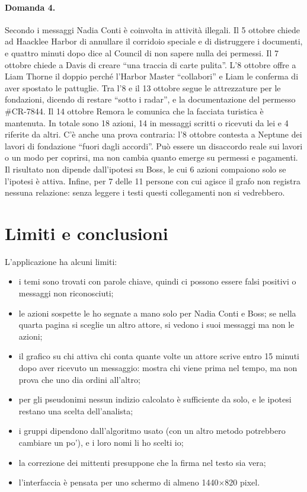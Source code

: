 \documentclass[11pt,a4paper]{article}
\begin{document}
\paragraph{Domanda 4.} Secondo i messaggi Nadia Conti è coinvolta in attività illegali. Il 5 ottobre chiede ad
Haacklee Harbor di annullare il corridoio speciale e di distruggere i documenti, e quattro minuti dopo dice al
Council di non sapere nulla dei permessi. Il 7 ottobre chiede a Davis di creare ``una traccia di carte pulita''.
L'8 ottobre offre a Liam Thorne il doppio perché l'Harbor Master ``collabori'' e Liam le conferma di aver
spostato le pattuglie. Tra l'8 e il 13 ottobre segue le attrezzature per le fondazioni, dicendo di restare
``sotto i radar'', e la documentazione del permesso \#CR-7844. Il 14 ottobre Remora le comunica che la facciata
turistica è mantenuta. In totale sono 18 azioni, 14 in messaggi scritti o ricevuti da lei e 4 riferite da altri.
C'è anche una prova contraria: l'8 ottobre contesta a Neptune dei lavori di fondazione ``fuori dagli accordi''.
Può essere un disaccordo reale sui lavori o un modo per coprirsi, ma non cambia quanto emerge su permessi e
pagamenti. Il risultato non dipende dall'ipotesi su Boss, le cui 6 azioni compaiono solo se l'ipotesi è attiva.
Infine, per 7 delle 11 persone con cui agisce il grafo non registra nessuna relazione: senza leggere i testi
questi collegamenti non si vedrebbero.

\section{Limiti e conclusioni}
L'applicazione ha alcuni limiti:
\begin{itemize}
  \item i temi sono trovati con parole chiave, quindi ci possono essere falsi positivi o messaggi non
        riconosciuti;
  \item le azioni sospette le ho segnate a mano solo per Nadia Conti e Boss; se nella quarta pagina si sceglie
        un altro attore, si vedono i suoi messaggi ma non le azioni;
  \item il grafico su chi attiva chi conta quante volte un attore scrive entro 15 minuti dopo aver ricevuto un
        messaggio: mostra chi viene prima nel tempo, ma non prova che uno dia ordini all'altro;
  \item per gli pseudonimi nessun indizio calcolato è sufficiente da solo, e le ipotesi restano una scelta
        dell'analista;
  \item i gruppi dipendono dall'algoritmo usato (con un altro metodo potrebbero cambiare un po'), e i loro nomi li ho scelti io;
  \item la correzione dei mittenti presuppone che la firma nel testo sia vera;
  \item l'interfaccia è pensata per uno schermo di almeno 1440$\times$820 pixel.
\end{itemize}
\end{document}
